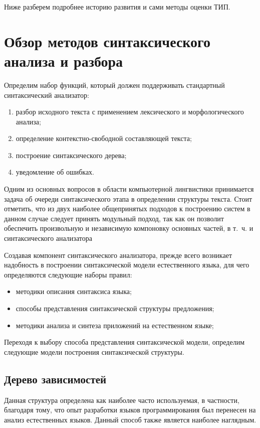 \documentclass[a4paper,14pt,russian]{extreport}
\begin{document}
Ниже разберем подробнее историю развития и сами методы оценки \mbox{ТИП}.

\section{Обзор методов синтаксического анализа и разбора}
Определим набор функций, который должен поддерживать стандартный синтаксический анализатор:

\begin{enumerate}
\item разбор исходного текста с применением лексического и морфологического анализа;
\item определение контекстно-свободной составляющей текста;
\item построение синтаксического дерева;
\item уведомление об ошибках.
\end{enumerate}

Одним из основных вопросов в области компьютерной лингвистики принимается задача об очереди синтаксического этапа в определении структуры текста. Стоит отметить, что из двух наиболее общепринятых подходов к построению систем в данном случае следует принять модульный подход, так как он позволит обеспечить произвольную и независимую компоновку основных частей, в т.~ч. и синтаксического анализатора

Создавая компонент синтаксического анализатора, прежде всего возникает надобность в построении синтаксической модели естественного языка, для чего определяются следующие наборы правил:

\begin{itemize}
\item методики описания синтаксиса языка;
\item способы представления синтаксической структуры предложения;
\item методики анализа и синтеза приложений на естественном языке;
\end{itemize}

Переходя к выбору способа представления синтаксической модели, определим следующие модели построения синтаксической структуры.

\subsection{Дерево зависимостей}

Данная структура определена как наиболее часто используемая, в частности, благодаря тому, что опыт разработки языков программирования был перенесен на анализ естественных языков. Данный способ также является наиболее наглядным.
\end{document}
